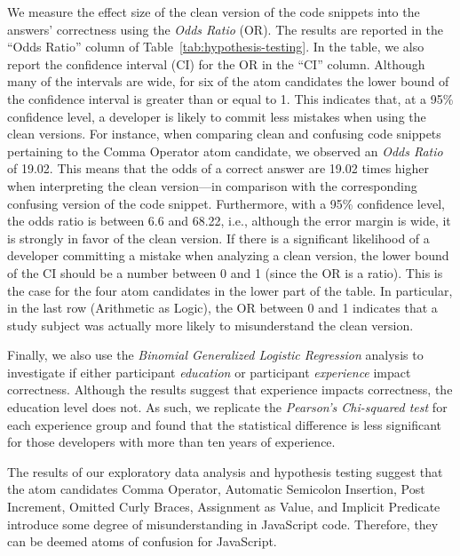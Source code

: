 We measure the effect size of the clean version of the code snippets into the answers' correctness using the \emph{Odds Ratio} (OR). The results are reported in the ``Odds Ratio'' column of Table~\ref{tab:hypothesis-testing}. In the table, we also report the confidence interval (CI) for the OR in the ``CI'' column. Although many of the intervals are wide, for six of the atom candidates the lower bound of the confidence interval is greater than or equal to 1. This indicates that, at a 95\% confidence level, a developer is likely to commit less mistakes when using the clean versions.
For instance, when comparing clean and confusing code snippets pertaining to the Comma Operator atom candidate, we observed an \emph{Odds Ratio} of \num{19.02}. This means that the odds of a correct answer are \num{19.02} times higher when interpreting the clean version---in comparison with the corresponding confusing version of the code snippet. Furthermore, with a 95\% confidence level, the odds  ratio is between 6.6 and 68.22, i.e., although the error margin is wide, it is strongly in favor of the clean version. If there is a significant likelihood of a developer committing a mistake when analyzing a clean version, the lower bound of the CI should be a number between 0 and 1 (since the OR is a ratio). This is the case for the four atom candidates in the lower part of the table. In particular, in the last row (Arithmetic as Logic), the OR between 0 and 1 indicates that a study subject was actually more likely to misunderstand the clean version. 

Finally, we also use the \emph{Binomial Generalized Logistic Regression} analysis to investigate if either participant \emph{education} or participant \emph{experience} impact correctness. Although the results suggest that experience impacts correctness, the education level does not. As such, we replicate the \emph{Pearson's Chi-squared test} for each experience group and found that the statistical difference is less significant for those developers with more than ten years of experience. 

\begin{mh}
  The results of our exploratory data analysis and
  hypothesis testing suggest that the atom
  candidates Comma Operator, Automatic Semicolon Insertion, Post Increment, Omitted Curly Braces, 
  Assignment as Value, and
  Implicit Predicate %
  introduce some degree of misunderstanding
  in JavaScript code. %
  Therefore, they can be deemed atoms of confusion for JavaScript.
\end{mh}

